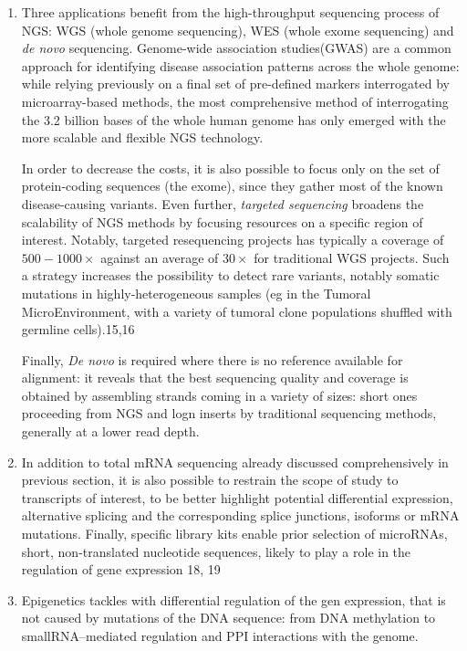 \begin{enumerate}[label=(\roman*)]

\item[Genomics sequencing:] Three applications benefit from the high-throughput sequencing process of NGS: WGS (whole genome sequencing), WES (whole exome sequencing) and \textit{de novo} sequencing. Genome-wide association studies(GWAS) are a common approach for identifying disease association patterns across the whole genome: while relying previously on a final set of pre-defined markers interrogated by microarray-based methods, the most comprehensive method of interrogating the 3.2 billion bases of the whole human genome has only emerged with the more scalable and flexible NGS technology. 

In order to decrease the costs, it is also possible to focus only on the set of protein-coding sequences (the exome), since they  gather most of the known disease-causing variants. Even further, \textit{targeted sequencing} broadens the scalability of NGS methods by focusing resources on a specific region of interest. Notably, targeted resequencing projects has typically a coverage of $500-1000 \times$ against an average of $30\times$ for traditional WGS projects. Such a strategy increases the possibility to detect rare variants, notably somatic mutations in highly-heterogeneous samples (eg in the Tumoral MicroEnvironment, with a variety of tumoral clone populations shuffled with germline cells).15,16 

Finally, \textit{De novo} is required where there is no reference available for alignment: it reveals that the best sequencing quality and coverage is obtained by assembling strands coming in a variety of sizes: short ones proceeding from NGS and logn inserts by traditional sequencing methods, generally at a lower read depth. 

\item[Transcriptomics] In addition to total mRNA sequencing already discussed comprehensively in previous section, it is also possible to restrain the scope of study to transcripts of interest, to be better highlight potential differential expression, alternative splicing and the corresponding splice junctions, isoforms or mRNA mutations. Finally, specific library kits enable prior selection of microRNAs, short, non-translated nucleotide sequences, likely to play a role in the regulation of gene expression 18, 19

\item[Epigenomics] Epigenetics tackles with differential regulation of the gen expression, that is not caused by mutations of the DNA sequence: from DNA methylation to smallRNA–mediated regulation and PPI interactions with the genome.


\end{enumerate}
